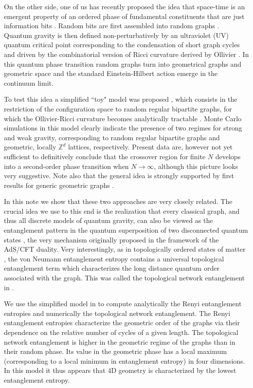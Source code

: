 \documentclass[twocolumn,
preprintnumbers,amsmath,amssymb]{revtex4}
\begin{document}
On the other side, one of us has recently proposed the idea that space-time is an emergent property of an ordered phase of fundamental constituents that are just information bits \cite{tru1}. Random bits are first assembled into random graphs \cite{graphrev}. Quantum gravity is then defined non-perturbatively by an ultraviolet (UV) quantum critical point corresponding to the condensation of short graph cycles and driven by the combinatorial version of Ricci curvature derived by Ollivier \cite{olli1}. In this quantum phase transition random graphs turn into geometrical graphs \cite{geom} and geometric space and the standard Einstein-Hilbert action emerge in the continuum limit.  

To test this idea a simplified ``toy" model was proposed \cite{tru2}, which consists in the restriction of the configuration space to random regular bipartite graphs, for which the Ollivier-Ricci curvature becomes analytically tractable \cite{olli2}. Monte Carlo simulations in this model clearly indicate the presence of two regimes for strong and weak gravity, corresponding to random regular bipartite graphs and geometric, locally $\mathbb{Z}^d$ lattices, respectively. Present data are, however not yet sufficient to definitively conclude that the crossover region for finite $N$ develops into a second-order phase transition when $N\to \infty$, although this picture looks very suggestive. Note also that the general idea is strongly supported by first results for generic geometric graphs \cite{krioukov}. 

In this note we show that these two approaches are very closely related. The crucial idea we use to this end is the realization that every classical graph, and thus all discrete models of quantum gravity, can also be viewed as the entanglement pattern in the quantum superposition of two disconnected quantum states \cite{zan}, the very mechanism originally proposed in the framework of the AdS/CFT duality. Very interestingly, as in topologically ordered states of matter \cite{top}, the von Neumann entanglement entropy contains a universal topological entanglement term \cite{kit} which characterizes the long distance quantum order associated with the graph. This was called the topological network entanglement in \cite{zan}.

We use the simplified model in \cite{tru2} to compute analytically the Renyi entanglement entropies and numerically the topological network entanglement. The Renyi entanglement entropies characterize the geometric order of the graphs via their dependence on the relative number of cycles of a given length. The topological network entanglement is higher in the geometric regime of the graphs than in their random phase. Its value in the geometric phase has a local maximum (corresponding to a local minimum in entanglement entropy) in four dimensions. In this model it thus appears that 4D geometry is characterized by the lowest entanglement entropy. 
\end{document}
